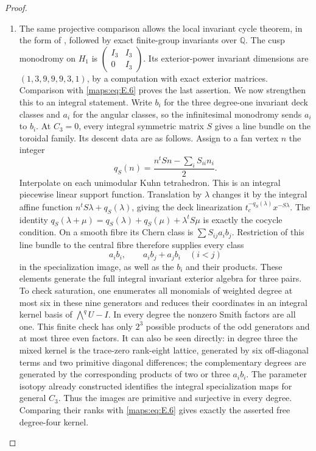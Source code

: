 \begin{proof}
\begin{enumerate}[label={$\langle1\rangle$\arabic*.},leftmargin=*]
\item The same projective comparison allows the local invariant cycle
theorem, in the form of \cite[Theorem B]{ffChen}, followed by exact
finite-group invariants over $\mathbb Q$.  The cusp monodromy on
$H_1$ is $\left(\begin{smallmatrix}I_3&I_3\\0&I_3\end{smallmatrix}\right)$.
Its exterior-power invariant dimensions are
$(1,3,9,9,9,3,1)$, by a computation with exact exterior matrices.  Comparison with \eqref{maps:eq:E.6} proves the last assertion.
We now strengthen this to an integral statement.  Write $b_i$ for the
three degree-one invariant deck classes and $a_i$ for the angular
classes, so the infinitesimal monodromy sends $a_i$ to $b_i$.
At $C_3=0$, every integral symmetric matrix $S$ gives a line bundle
on the toroidal family.  Its descent data are as follows.  Assign to a fan vertex $n$
the integer
\[
 q_S(n)=\frac{n^tSn-\sum_iS_{ii}n_i}{2}.
\]
Interpolate on each unimodular Kuhn tetrahedron.  This is an integral
piecewise linear support function.  Translation by $\lambda$ changes
it by the integral affine function
$n^tS\lambda+q_S(\lambda)$, giving the deck linearization
$t_c^{-q_S(\lambda)}x^{-S\lambda}$.
The identity
$q_S(\lambda+\mu)=q_S(\lambda)+q_S(\mu)+\lambda^tS\mu$
is exactly the cocycle condition.  On a smooth fibre its Chern class
is $\sum S_{ij}a_i b_j$.  Restriction of this line bundle to the
central fibre therefore supplies every class
\[
 a_i b_i,\qquad a_i b_j+a_j b_i\quad(i<j)
\]
in the specialization image, as well as the $b_i$ and their products.
These elements generate the full integral invariant exterior algebra
for three pairs.  To check saturation, one enumerates all monomials of weighted degree at most six in these
nine generators and reduces their coordinates in an integral kernel
basis of $\bigwedge^q U-I$.  In every degree the nonzero Smith factors
are all one.  This finite check has only $2^3$ possible products of
the odd generators and at most three even factors.  It can also be
seen directly: in degree three the mixed kernel is the trace-zero
rank-eight lattice, generated by six off-diagonal terms and two
primitive diagonal differences; the complementary degrees are
generated by the corresponding products of two or three $a_i b_i$.
The parameter isotopy already constructed identifies the integral
specialization maps for general $C_3$.  Thus the images are primitive
and surjective in every degree.  Comparing their ranks with \eqref{maps:eq:E.6}
gives exactly the asserted free degree-four kernel.
\end{enumerate}
\end{proof}

